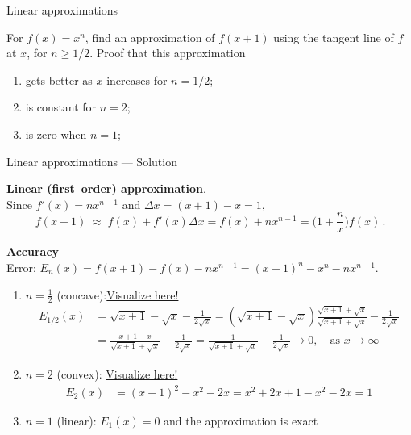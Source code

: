 \documentclass[9pt]{beamer}
\begin{document}
\begin{frame}{Linear approximations}

    For $f(x) = x^n$, find an approximation of $f(x + 1)$ using the tangent line of $f$ at $x$, for $n\geq 1/2$. Proof that this approximation
    
    \begin{enumerate}[leftmargin=0.5cm, label=(\alph*), rightmargin=0.2cm]
    
        \item gets better as $x$ increases for $n = 1/2$; 
        
        \item is constant for $n = 2$;
        
        \item is zero when $n = 1$;

    \end{enumerate}

\end{frame}

\begin{frame}{Linear approximations — Solution}

\small

\textbf{Linear (first–order) approximation}. \\
Since $f'(x) = nx^{n-1}$ and $\Delta x = (x+1) - x = 1$,
\[
\boxed{\,f(x+1)\;\approx\; f(x) + f'(x)\Delta x = f(x)+n x^{n-1}
=\Big(1+\frac{n}{x}\Big)f(x)\,}.
\]

\textbf{Accuracy} \\
Error: \;\;$E_n(x)=f(x+1) - f(x)-n x^{n-1} = (x+1)^n - x^n - nx^{n-1}$.

\begin{enumerate}[leftmargin=0.5cm, label=(\alph*), rightmargin=0.2cm]

\setlength\itemsep{1em}

\item $n=\tfrac12$ (concave):\hfill \href{https://www.desmos.com/calculator/axrcmgyl4q}{Visualize here!}
\begin{align*}
    E_{1/2}(x) 
    &= \sqrt{x+1} - \sqrt{x} - \frac{1}{2\sqrt{x}} 
    = (\sqrt{x+1} - \sqrt{x})\frac{\sqrt{x+1} + \sqrt{x}}{\sqrt{x+1} + \sqrt{x}} - \frac{1}{2\sqrt{x}} \\
    &= \frac{x+1 - x}{\sqrt{x+1} + \sqrt{x}} - \frac{1}{2\sqrt{x}} 
    = \frac{1}{\sqrt{x+1} + \sqrt{x}} - \frac{1}{2\sqrt{x}} 
    \longrightarrow 0, \quad \text{as } x\to \infty
\end{align*}

\item $n=2$ (convex): \hfill \href{https://www.desmos.com/calculator/isechopx1v}{Visualize here!} 
\begin{align*}
    E_{2}(x) 
    &= (x+1)^2 - x^2 - 2x 
    = x^2+2x+1 - x^2 - 2x
    = 1
\end{align*}

\item $n=1$ (linear): $E_1(x)=0$ and the approximation is exact

\end{enumerate}


\end{frame}
\end{document}
